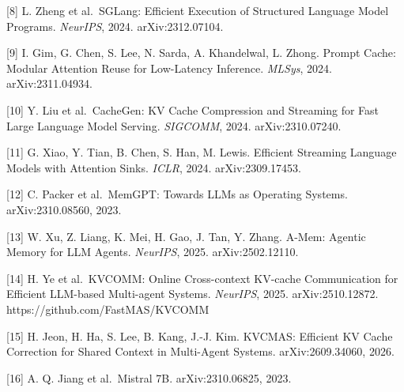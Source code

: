 \documentclass[
  10pt,
]{article}
\begin{document}
{[}8{]} L. Zheng et al.~SGLang: Efficient Execution of Structured
Language Model Programs. \emph{NeurIPS}, 2024. arXiv:2312.07104.

{[}9{]} I. Gim, G. Chen, S. Lee, N. Sarda, A. Khandelwal, L. Zhong.
Prompt Cache: Modular Attention Reuse for Low-Latency Inference.
\emph{MLSys}, 2024. arXiv:2311.04934.

{[}10{]} Y. Liu et al.~CacheGen: KV Cache Compression and Streaming for
Fast Large Language Model Serving. \emph{SIGCOMM}, 2024.
arXiv:2310.07240.

{[}11{]} G. Xiao, Y. Tian, B. Chen, S. Han, M. Lewis. Efficient
Streaming Language Models with Attention Sinks. \emph{ICLR}, 2024.
arXiv:2309.17453.

{[}12{]} C. Packer et al.~MemGPT: Towards LLMs as Operating Systems.
arXiv:2310.08560, 2023.

{[}13{]} W. Xu, Z. Liang, K. Mei, H. Gao, J. Tan, Y. Zhang. A-Mem:
Agentic Memory for LLM Agents. \emph{NeurIPS}, 2025. arXiv:2502.12110.

{[}14{]} H. Ye et al.~KVCOMM: Online Cross-context KV-cache
Communication for Efficient LLM-based Multi-agent Systems.
\emph{NeurIPS}, 2025. arXiv:2510.12872.
https://github.com/FastMAS/KVCOMM

{[}15{]} H. Jeon, H. Ha, S. Lee, B. Kang, J.-J. Kim. KVCMAS: Efficient
KV Cache Correction for Shared Context in Multi-Agent Systems.
arXiv:2609.34060, 2026.

{[}16{]} A. Q. Jiang et al.~Mistral 7B. arXiv:2310.06825, 2023.
\end{document}
